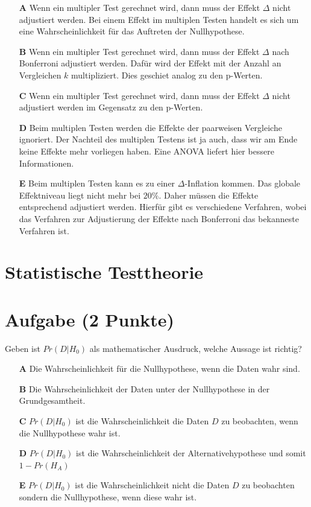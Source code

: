 \documentclass[a4paper, 9pt]{scrartcl}\usepackage[]{graphicx}\usepackage[]{xcolor}
\begin{document}
\begin{enumerate}
\item [\textbf{A} \msquare] Wenn ein multipler Test gerechnet wird, dann muss der Effekt $\Delta$ nicht adjustiert werden. Bei einem Effekt im multiplen Testen handelt es sich um eine Wahrscheinlichkeit für das Auftreten der Nullhypothese.
\item [\textbf{B} \msquare] Wenn ein multipler Test gerechnet wird, dann muss der Effekt $\Delta$ nach Bonferroni adjustiert werden. Dafür wird der Effekt mit der Anzahl an Vergleichen $k$ multipliziert. Dies geschiet analog zu den p-Werten.
\item [\textbf{C} \msquare] Wenn ein multipler Test gerechnet wird, dann muss der Effekt $\Delta$ nicht adjustiert werden im Gegensatz zu den p-Werten.
\item [\textbf{D} \msquare] Beim multiplen Testen werden die Effekte der paarweisen Vergleiche ignoriert. Der Nachteil des multiplen Testens ist ja auch, dass wir am Ende keine Effekte mehr vorliegen haben. Eine ANOVA liefert hier bessere Informationen.
\item [\textbf{E} \msquare] Beim multiplen Testen kann es zu einer $\Delta$-Inflation kommen. Das globale Effektniveau liegt nicht mehr bei $20\%$. Daher müssen die Effekte entsprechend adjustiert werden. Hierfür gibt es verschiedene Verfahren, wobei das Verfahren zur Adjustierung der Effekte nach Bonferroni das bekanneste Verfahren ist.
\end{enumerate}
\section*{Statistische Testtheorie}  

\section{Aufgabe \hfill (2 Punkte)}




Geben ist $Pr(D|H_0)$ als mathematischer Ausdruck, welche Aussage ist richtig?



\begin{enumerate}
\item [\textbf{A} \msquare] Die Wahrscheinlichkeit für die Nullhypothese, wenn die Daten wahr sind.
\item [\textbf{B} \msquare] Die Wahrscheinlichkeit der Daten unter der Nullhypothese in der Grundgesamtheit.
\item [\textbf{C} \msquare] $Pr(D|H_0)$ ist die Wahrscheinlichkeit die Daten $D$ zu beobachten, wenn die Nullhypothese wahr ist.
\item [\textbf{D} \msquare] $Pr(D|H_0)$ ist die Wahrscheinlichkeit der Alternativehypothese und somit $1 - Pr(H_A)$
\item [\textbf{E} \msquare] $Pr(D|H_0)$ ist die Wahrscheinlichkeit nicht die Daten $D$ zu beobachten sondern die Nullhypothese, wenn diese wahr ist.
\end{enumerate}
\end{document}
